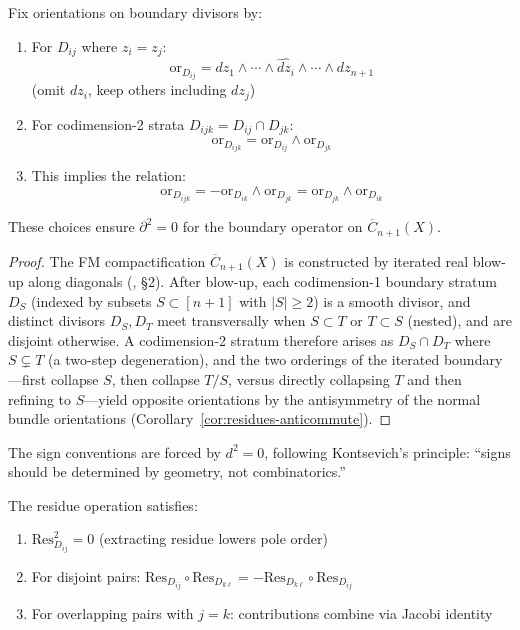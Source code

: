    \begin{lemma}\label{lem:orientation}
   Fix orientations on boundary divisors by:
   \begin{enumerate}
   \item For $D_{ij}$ where $z_i = z_j$:
      \[\text{or}_{D_{ij}} = dz_1 \wedge \cdots \wedge \widehat{dz_i} \wedge \cdots \wedge dz_{n+1}\]
      (omit $dz_i$, keep others including $dz_j$)
      
   \item For codimension-2 strata $D_{ijk} = D_{ij} \cap D_{jk}$:
      \[\text{or}_{D_{ijk}} = \text{or}_{D_{ij}} \wedge \text{or}_{D_{jk}}\]
      
   \item This implies the relation:
      \[\text{or}_{D_{ijk}} = -\text{or}_{D_{ik}} \wedge \text{or}_{D_{jk}} = \text{or}_{D_{jk}} \wedge \text{or}_{D_{ik}}\]
   \end{enumerate}
   
   These choices ensure $\partial^2 = 0$ for the boundary operator on $\overline{C}_{n+1}(X)$.
   \end{lemma}
   
   \begin{proof}
   The FM compactification $\overline{C}_{n+1}(X)$ is constructed by iterated real blow-up along diagonals (\cite{FM94}, \S2).  After blow-up, each codimension-1 boundary stratum $D_S$ (indexed by subsets $S \subset [n+1]$ with $|S| \geq 2$) is a smooth divisor, and distinct divisors $D_S, D_T$ meet transversally when $S \subset T$ or $T \subset S$ (nested), and are disjoint otherwise.  A codimension-2 stratum therefore arises as $D_S \cap D_T$ where $S \subsetneq T$ (a two-step degeneration), and the two orderings of the iterated boundary---first collapse $S$, then collapse $T/S$, versus directly collapsing $T$ and then refining to $S$---yield opposite orientations by the antisymmetry of the normal bundle orientations (Corollary~\ref{cor:residues-anticommute}).
   \end{proof}
   
   \begin{remark}
   The sign conventions are forced by $d^2 = 0$, following Kontsevich's principle: ``signs should be determined by geometry, not combinatorics.''
   \end{remark}
   
   \begin{lemma}
   \label{lem:residue-properties}
   The residue operation satisfies:
   \begin{enumerate}
   \item $\text{Res}_{D_{ij}}^2 = 0$ (extracting residue lowers pole order)
   \item For disjoint pairs: $\text{Res}_{D_{ij}} \circ \text{Res}_{D_{k\ell}} = -\text{Res}_{D_{k\ell}} \circ \text{Res}_{D_{ij}}$
   \item For overlapping pairs with $j = k$: contributions combine via Jacobi identity
   \end{enumerate}
   \end{lemma}
   

